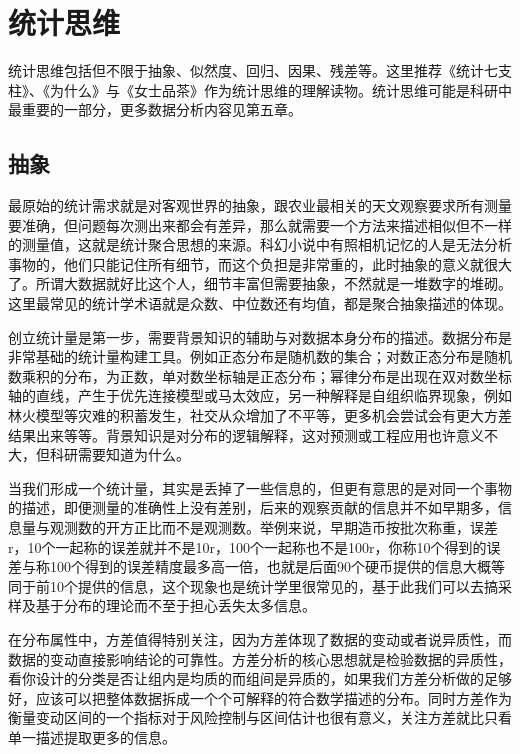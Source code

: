 \documentclass[]{tufte-book}
\begin{document}
\hypertarget{ux7edfux8ba1ux601dux7ef4}{%
\section{统计思维}\label{ux7edfux8ba1ux601dux7ef4}}

统计思维包括但不限于抽象、似然度、回归、因果、残差等。这里推荐《统计七支柱》、《为什么》与《女士品茶》作为统计思维的理解读物。统计思维可能是科研中最重要的一部分，更多数据分析内容见第五章。

\hypertarget{ux62bdux8c61}{%
\subsection{抽象}\label{ux62bdux8c61}}

最原始的统计需求就是对客观世界的抽象，跟农业最相关的天文观察要求所有测量要准确，但问题每次测出来都会有差异，那么就需要一个方法来描述相似但不一样的测量值，这就是统计聚合思想的来源。科幻小说中有照相机记忆的人是无法分析事物的，他们只能记住所有细节，而这个负担是非常重的，此时抽象的意义就很大了。所谓大数据就好比这个人，细节丰富但需要抽象，不然就是一堆数字的堆砌。这里最常见的统计学术语就是众数、中位数还有均值，都是聚合抽象描述的体现。

创立统计量是第一步，需要背景知识的辅助与对数据本身分布的描述。数据分布是非常基础的统计量构建工具。例如正态分布是随机数的集合；对数正态分布是随机数乘积的分布，为正数，单对数坐标轴是正态分布；幂律分布是出现在双对数坐标轴的直线，产生于优先连接模型或马太效应，另一种解释是自组织临界现象，例如林火模型等灾难的积蓄发生，社交从众增加了不平等，更多机会尝试会有更大方差结果出来等等。背景知识是对分布的逻辑解释，这对预测或工程应用也许意义不大，但科研需要知道为什么。

当我们形成一个统计量，其实是丢掉了一些信息的，但更有意思的是对同一个事物的描述，即便测量的准确性上没有差别，后来的观察贡献的信息并不如早期多，信息量与观测数的开方正比而不是观测数。举例来说，早期造币按批次称重，误差r，10个一起称的误差就并不是10r，100个一起称也不是100r，你称10个得到的误差与称100个得到的误差精度最多高一倍，也就是后面90个硬币提供的信息大概等同于前10个提供的信息，这个现象也是统计学里很常见的，基于此我们可以去搞采样及基于分布的理论而不至于担心丢失太多信息。

在分布属性中，方差值得特别关注，因为方差体现了数据的变动或者说异质性，而数据的变动直接影响结论的可靠性。方差分析的核心思想就是检验数据的异质性，看你设计的分类是否让组内是均质的而组间是异质的，如果我们方差分析做的足够好，应该可以把整体数据拆成一个个可解释的符合数学描述的分布。同时方差作为衡量变动区间的一个指标对于风险控制与区间估计也很有意义，关注方差就比只看单一描述提取更多的信息。
\end{document}
